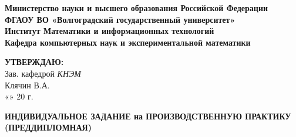 \documentclass[12pt,a4paper]{scrartcl}
\begin{document}
	\phantom{fake text for spacing}
	\begin{center}
		\textbf{Министерство науки и высшего образования Российской Федерации} \\
		\textbf{ФГАОУ ВО «Волгоградский государственный университет»} \\
		\textbf{Институт Математики и информационных технологий} \\
		\textbf{Кафедра компьютерных наук и экспериментальной математики} \\
		
		\vspace{0.6cm}
		
		\hfill\begin{minipage}{0.4\textwidth}
		\begin{flushright}
			\textbf{\textsc{УТВЕРЖДАЮ:}} \\
			Зав. кафедрой \textit{КНЭМ} \\
			Клячин В.А.\\
			«\underline{\hspace{0.7cm}}» \underline{\hspace{2.5cm}} 20\underline{\hspace{0.7cm}} г.
		\end{flushright}
		\end{minipage}
		
		\vspace{0.6cm}
		
		\textbf{
			ИНДИВИДУАЛЬНОЕ ЗАДАНИЕ на ПРОИЗВОДСТВЕННУЮ ПРАКТИКУ (ПРЕДДИПЛОМНАЯ)
			\vspace{0.2cm}
		}
		
		\vspace{0.3cm}
		\renewcommand{\arraystretch}{1.5} %
		

\end{center}
\end{document}
